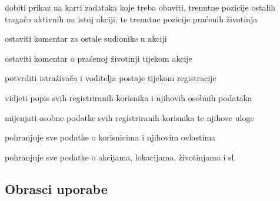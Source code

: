 \begin{packed_enum}
\begin{packed_enum}
				\end{packed_enum}
				
				\item  {}
				
				\begin{packed_enum}
					 
					\item dobiti prikaz na karti zadataka koje treba obaviti, trenutne pozicije ostalih tragača aktivnih na istoj akciji, te trenutne pozicije praćenih životinja 
					\item ostaviti komentar za ostale sudionike u akciji
					\item ostaviti komentar o praćenoj životinji tijekom akcije 
					
				\end{packed_enum}
				
				\item  {}
				
				\begin{packed_enum}
					
					\item potvrditi istraživača i voditelja postaje tijekom registracije
					\item vidjeti popis svih registriranih korisnika i njihovih osobnih podataka  
					\item mijenjati osobne podatke svih registriranih korisnika te njihove uloge
					
				\end{packed_enum}
				
				\item  {}
				
				\begin{packed_enum}
					
					\item pohranjuje sve podatke o korisnicima i njihovim ovlastima 
					\item pohranjuje sve podatke o akcijama, lokacijama, životinjama i sl. 
					
				\end{packed_enum}
			\end{packed_enum}
			
			\eject 
			
			
				
			\subsection{Obrasci uporabe}
								
